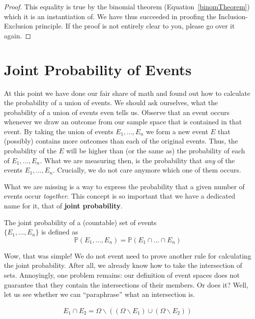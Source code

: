 \documentclass[a4paper,11pt,leqno]{report}
\begin{document}
\begin{proof}
This equality is true by the binomial theorem (Equation~\eqref{binomTheorem}) which it is an instantiation of.
We have thus succeeded in proofing the Inclusion-Exclusion principle. If the proof is not entirely
clear to you, please go over it again.
\end{proof}

\section{Joint Probability of Events}
At this point we have done our fair share of math and found out how to calculate the probability of a union
of events. We should ask ourselves, what the probability of a union of events even tells us. Observe that an event 
occurs whenever we draw an outcome from our sample space that is contained in that event. By taking the union
of events $ E_{1}, \ldots, E_{n} $ we form a new event $ E $ that (possibly) contains more outcomes than each 
of the original events. Thus, the probability of the $ E $ will be higher than (or the same as) the 
probability of each of $ E_{1}, \ldots, E_{n} $. What we are measuring then, is the probability that 
\textit{any} of the events $ E_{1}, \ldots, E_{n} $. Crucially, we do not care anymore which one of them
occurs.

What we are missing is a way to express the probability that a given number of events occur 
\textit{together}. This concept is so important that we have a dedicated name for it, that of 
\textbf{joint probability}.

\begin{Definition}{}
The joint probability of a (countable) set of events \\ $ \{E_{1}, \ldots, E_{n}\} $ is defined as
$$ \mathbb{P}(E_{1}, \ldots, E_{n}) = \mathbb{P}(E_{1} \cap \ldots \cap E_{n}) $$
\end{Definition}

Wow, that was simple! We do not event need to prove another rule for calculating the joint probability.
After all, we already know how to take the intersection of sets. Annoyingly, one problem remains: our
definition of event spaces does not guarantee that they contain the intersections of their members. Or does 
it? Well, let us see whether we can ``paraphrase'' what an intersection is.

\begin{align}
E_{1} \cap E_{2} = \Omega \backslash ((\Omega \backslash E_{1}) \cup (\Omega \backslash E_{2}))
\end{align}
\end{document}
